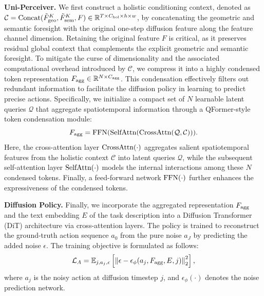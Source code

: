 \documentclass[runningheads]{llncs}
\begin{document}
\noindent \textbf{Uni-Perceiver.}
We first construct a holistic conditioning context, denoted as $\mathcal{C}=\textnormal{Concat}(\tilde{F}^{K}_\textnormal{geo}, \tilde{F}^{K}_\textnormal{sem}, F)\in\mathbb{R}^{T\times C_{\textnormal{hol}} \times h \times w}$, by concatenating the geometric and semantic foresight with the original one-step diffusion feature along the feature channel dimension. Retaining the original feature $F$ is critical, as it preserves residual global context that complements the explicit geometric and semantic foresight.
To mitigate the curse of dimensionality and the associated computational overhead introduced by $\mathcal{C}$, we compress it into a highly condensed token representation $F_\textnormal{agg} \in \mathbb{R}^{N \times C_\textnormal{agg}}$. This condensation effectively filters out redundant information to facilitate the diffusion policy in learning to predict precise actions. Specifically, we initialize a compact set of $N$ learnable latent queries $\mathcal{Q}$ that aggregate spatiotemporal information through a QFormer-style~\cite{li2023blip,jaegle2022perceiver} token condensation module:
\begin{equation}
    F_\textnormal{agg} = \text{FFN}(\text{SelfAttn}(\text{CrossAttn}(\mathcal{Q}, \mathcal{C}))).
    \label{eq:aggregation}
\end{equation}
Here, the cross-attention layer $\textnormal{CrossAttn}(\cdot)$ aggregates salient spatiotemporal features from the holistic context $\mathcal{C}$ into latent queries $\mathcal{Q}$, while the subsequent self-attention layer $\textnormal{SelfAttn}(\cdot)$ models the internal interactions among these $N$ condensed tokens. Finally, a feed-forward network $\textnormal{FFN}(\cdot)$ further enhances the expressiveness of the condensed tokens.


\noindent \textbf{Diffusion Policy.}
Finally, we incorporate the aggregated representation $F_\textnormal{agg}$ and the text embedding $E$ of the task description into a Diffusion Transformer (DiT) architecture via cross-attention layers. The policy is trained to reconstruct the ground-truth action sequence $a_0$ from the pure noise $a_J$ by predicting the added noise $\epsilon$. The training objective is formulated as follows:
\begin{equation}
    \mathcal{L}_A = \mathbb{E}_{j, a_j, \epsilon} \left[ \left\| \epsilon - \epsilon_\phi(a_j, F_\textnormal{agg}, E, j) \right\|_2^2 \right],
\end{equation}
where $a_j$ is the noisy action at diffusion timestep $j$, and $\epsilon_\phi(\cdot)$ denotes the noise prediction network.
\end{document}
